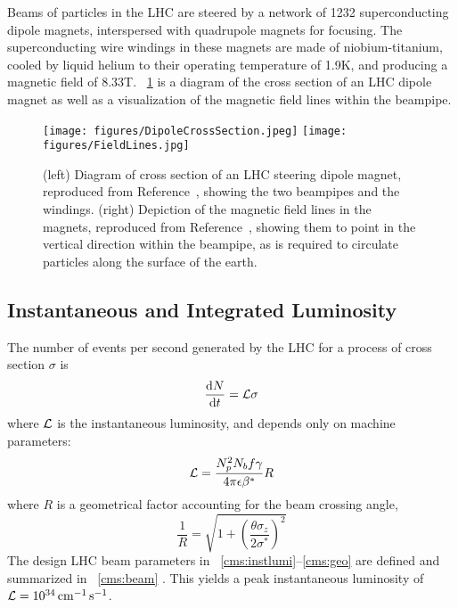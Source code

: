 Beams of particles in the LHC are steered by a network of 1232 superconducting dipole magnets, interspersed with quadrupole magnets for focusing.
The superconducting wire windings in these magnets are made of niobium-titanium, cooled by liquid helium to their operating temperature of 1.9\unit{K}, and producing a magnetic field of 8.33\unit{T}.
\Fig~\ref{cms:dipole} is a diagram of the cross section of an LHC dipole magnet as well as a visualization of the magnetic field lines within the beampipe.

\begin{figure}[tpb]
  \centering
  \texttt{[image: figures/DipoleCrossSection.jpeg]}
  \texttt{[image: figures/FieldLines.jpg]}
  \caption{(left) Diagram of cross section of an LHC steering dipole magnet, reproduced from Reference~\cite{Team:40524}, showing the two beampipes and the windings. (right) Depiction of the magnetic field lines in the magnets, reproduced from Reference~\cite{Jean-Luc:841503}, showing them to point in the vertical direction within the beampipe, as is required to circulate particles along the surface of the earth.}
  \label{cms:dipole}
\end{figure}

\subsection{Instantaneous and Integrated Luminosity}
The number of events per second generated by the LHC for a process of cross section $\sigma$ is
\begin{equation}
  \frac{\mathop{}\!\mathrm{d}N}{\mathop{}\!\mathrm{d}t} = \mathcal{L} \sigma
  \label{cms:nEvents}
\end{equation}
where $\mathcal{L}$ is the instantaneous luminosity, and depends only on machine parameters:
\begin{equation}
  \mathcal{L} = \frac{N_p^2 N_b f \gamma}{4 \pi \epsilon \beta^*} R 
  \label{cms:instlumi}
\end{equation}
where $R$ is a geometrical factor accounting for the beam crossing angle,
\begin{equation}
  \frac{1}{R} = \sqrt{1 + \left(\frac{\theta\sigma_z}{2\sigma^*}\right)^2}
  \label{cms:geo}
\end{equation}
The design LHC beam parameters in \Eqs~\ref{cms:instlumi}--\ref{cms:geo} are defined and summarized in \Tab~\ref{cms:beam} \cite{Bruning:782076, Baird:1017689}.
This yields a peak instantaneous luminosity of $\mathcal{L} = 10^{34} \,  \mathrm{cm}^{-1} \, \mathrm{s}^{-1}$.


